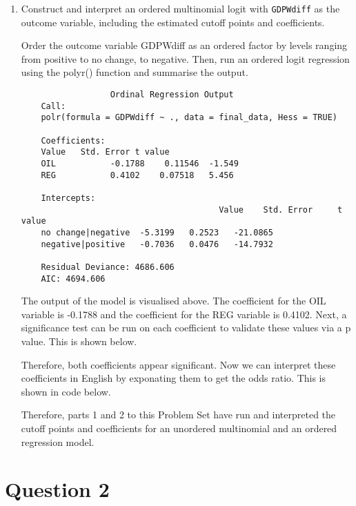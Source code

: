 \documentclass[12pt,letterpaper]{article}
\begin{document}
\begin{enumerate}
	\item Construct and interpret an ordered multinomial logit with \texttt{GDPWdiff} as the outcome variable, including the estimated cutoff points and coefficients.
	
Order the outcome variable GDPWdiff as an ordered factor by levels ranging from positive to no change, to negative. Then, run an ordered logit regression using the polyr() function and summarise the output. 

	 
	 
	 	\begin{verbatim}
	              Ordinal Regression Output 
	Call:
	polr(formula = GDPWdiff ~ ., data = final_data, Hess = TRUE)
	
	Coefficients:
	Value   Std. Error t value
	OIL           -0.1788    0.11546  -1.549
	REG           0.4102    0.07518   5.456
	
	Intercepts:
										Value    Std. Error 	t value 
	no change|negative  -5.3199   0.2523   -21.0865
	negative|positive   -0.7036   0.0476   -14.7932
	
	Residual Deviance: 4686.606 
	AIC: 4694.606 
	\end{verbatim}

The output of the model is visualised above. The coefficient for the OIL variable is -0.1788 and the coefficient for the REG variable is 0.4102. Next, a significance test can be run on each coefficient to validate these values via a p value. This is shown below. 

	 

Therefore, both coefficients appear significant. Now we can interpret these coefficients in English by exponating them to get the odds ratio. This is shown in code below.

	 

Therefore,  parts 1 and 2 to this Problem Set have run and interpreted the cutoff points and coefficients for an unordered multinomial and an ordered regression model. 

\end{enumerate}

\section*{Question 2} 
\vspace{.25cm}
\end{document}
